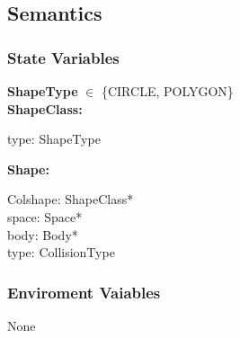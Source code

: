 \documentclass[12pt]{article}
\newcommand{\R}{$\mathbb{R}$}
\begin{document}
\subsection{Semantics}

\subsubsection{State Variables} \label{SecSVShape}
	\textbf{ShapeType} $\in$ \{CIRCLE, POLYGON\} \\
	\noindent 
	\noindent \textbf{ShapeClass:}
	\begin{multicols}{2}
		\noindent type: ShapeType \\
	\end{multicols}
	\noindent \textbf{Shape:}
	\begin{multicols}{2}
		\noindent Colshape: ShapeClass* \\
		space: Space* \\
		body: Body* \\
		type: CollisionType \\
	\end{multicols}
	

\subsubsection{Enviroment Vaiables}
None
\end{document}
